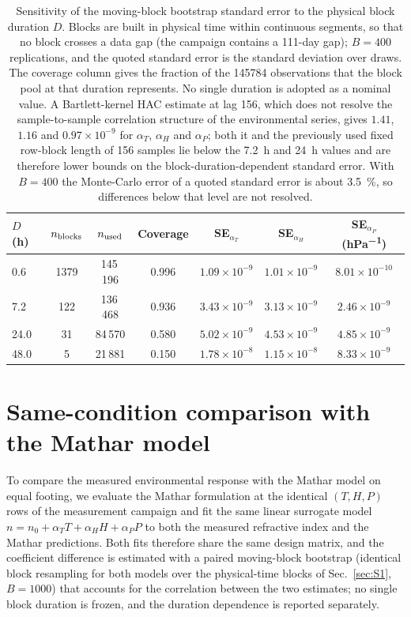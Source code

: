 \documentclass[aps,prapplied,reprint,superscriptaddress]{revtex4-2}
\begin{document}
\begin{table}[tbp]
\centering
\caption{Sensitivity of the moving-block bootstrap standard error to the physical block duration $D$. Blocks are built in physical time within continuous segments, so that no block crosses a data gap (the campaign contains a 111-day gap); $B = 400$ replications, and the quoted standard error is the standard deviation over draws. The coverage column gives the fraction of the \num{145784} observations that the block pool at that duration represents. No single duration is adopted as a nominal value. A Bartlett-kernel HAC estimate at lag 156, which does not resolve the sample-to-sample correlation structure of the environmental series, gives $1.41$, $1.16$ and $0.97\times10^{-9}$ for $\alpha_T$, $\alpha_H$ and $\alpha_P$; both it and the previously used fixed row-block length of 156 samples lie below the \SI{7.2}{\hour} and \SI{24}{\hour} values and are therefore lower bounds on the block-duration-dependent standard error. With $B = 400$ the Monte-Carlo error of a quoted standard error is about \SI{3.5}{\percent}, so differences below that level are not resolved.}
\label{tab:S1c}
\begin{tabular}{lcccccc}
\hline
$D$ (\si{\hour}) & $n_{\rm blocks}$ & $n_{\rm used}$ & Coverage & SE$_{\alpha_T}$ & SE$_{\alpha_H}$ & SE$_{\alpha_P}$ (\si{hPa^{-1}}) \\
\hline
0.6  & 1379 & 145\,196 & 0.996 & $1.09\times 10^{-9}$ & $1.01\times 10^{-9}$ & $8.01\times 10^{-10}$ \\
7.2  & 122  & 136\,468 & 0.936 & $3.43\times 10^{-9}$ & $3.13\times 10^{-9}$ & $2.46\times 10^{-9}$ \\
24.0 & 31   & 84\,570  & 0.580 & $5.02\times 10^{-9}$ & $4.53\times 10^{-9}$ & $4.85\times 10^{-9}$ \\
48.0 & 5    & 21\,881  & 0.150 & $1.78\times 10^{-8}$ & $1.15\times 10^{-8}$ & $8.33\times 10^{-9}$ \\
\hline
\end{tabular}
\end{table}

\section{Same-condition comparison with the Mathar model}
\label{sec:S2}

To compare the measured environmental response with the Mathar model on equal footing, we evaluate the Mathar formulation \cite{mathar2007refractive} at the identical $(T, H, P)$ rows of the measurement campaign and fit the same linear surrogate model $n = n_0 + \alpha_T T + \alpha_H H + \alpha_P P$ to both the measured refractive index and the Mathar predictions. Both fits therefore share the same design matrix, and the coefficient difference is estimated with a paired moving-block bootstrap (identical block resampling for both models over the physical-time blocks of Sec.~\ref{sec:S1}, $B = 1000$) that accounts for the correlation between the two estimates; no single block duration is frozen, and the duration dependence is reported separately.
\end{document}
